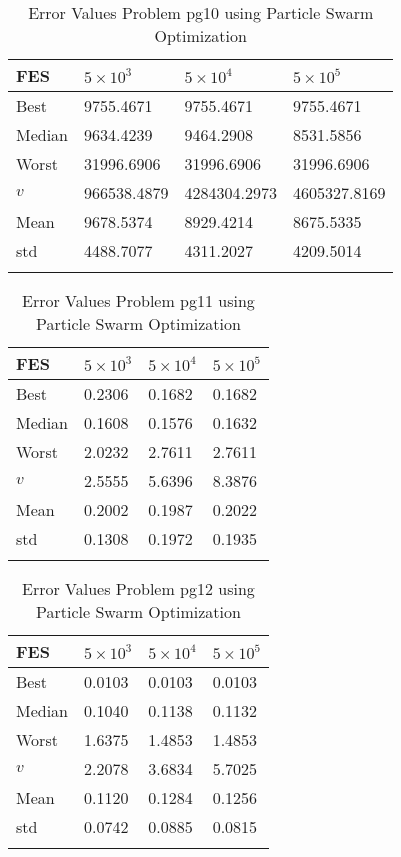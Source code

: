 \documentclass[10pt, a4paper]{book}
\begin{document}
\begin{center}
\begin{longtable}{l l l l}
FES & $5 \times 10^{3}$ & $5 \times 10^{4}$ & $5 \times 10^{5}$ \\
\hline
Best & 9755.4671 & 9755.4671 & 9755.4671 \\
Median & 9634.4239 & 9464.2908 & 8531.5856 \\
Worst & 31996.6906 & 31996.6906 & 31996.6906 \\
$v$ & 966538.4879 & 4284304.2973 & 4605327.8169 \\
Mean & 9678.5374 & 8929.4214 & 8675.5335 \\
std & 4488.7077 & 4311.2027 & 4209.5014 \\
\caption{ Error Values Problem pg10 using Particle Swarm Optimization }
\end{longtable}
\end{center}

\begin{center}
\begin{longtable}{l l l l}
FES & $5 \times 10^{3}$ & $5 \times 10^{4}$ & $5 \times 10^{5}$ \\
\hline
Best & 0.2306 & 0.1682 & 0.1682 \\
Median & 0.1608 & 0.1576 & 0.1632 \\
Worst & 2.0232 & 2.7611 & 2.7611 \\
$v$ & 2.5555 & 5.6396 & 8.3876 \\
Mean & 0.2002 & 0.1987 & 0.2022 \\
std & 0.1308 & 0.1972 & 0.1935 \\
\caption{ Error Values Problem pg11 using Particle Swarm Optimization }
\end{longtable}
\end{center}

\begin{center}
\begin{longtable}{l l l l}
FES & $5 \times 10^{3}$ & $5 \times 10^{4}$ & $5 \times 10^{5}$ \\
\hline
Best & 0.0103 & 0.0103 & 0.0103 \\
Median & 0.1040 & 0.1138 & 0.1132 \\
Worst & 1.6375 & 1.4853 & 1.4853 \\
$v$ & 2.2078 & 3.6834 & 5.7025 \\
Mean & 0.1120 & 0.1284 & 0.1256 \\
std & 0.0742 & 0.0885 & 0.0815 \\
\caption{ Error Values Problem pg12 using Particle Swarm Optimization }
\end{longtable}
\end{center}
\end{document}
